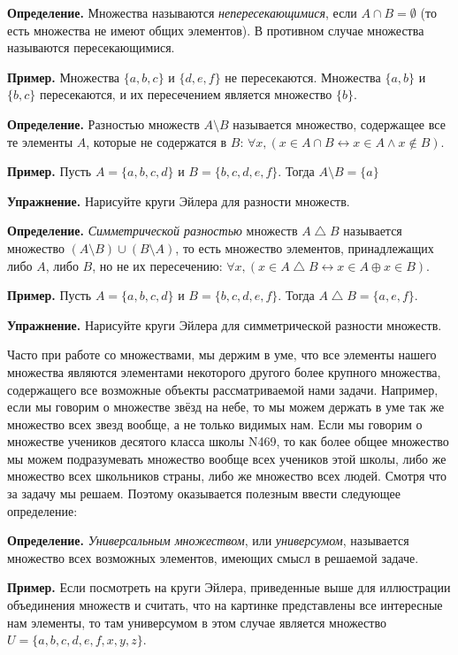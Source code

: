 {\bfseries Определение.} Множества называются {\slshape непересекающимися}, если $A\cap B = \emptyset$ (то есть множества не имеют общих элементов). В противном случае множества называются пересекающимися.

{\bfseries Пример.} Множества $\{a, b, c\}$ и $\{d, e, f\}$ не пересекаются. Множества $\{a, b\}$ и $\{b, c\}$ пересекаются, и их пересечением является множество $\{b\}$.

{\bfseries Определение.} Разностью множеств $A\setminus B$ называется множество, содержащее все те элементы $A$, которые не содержатся в $B$: $\forall x, (x \in A\cap B \leftrightarrow x\in A \wedge x \not \in B)$.

{\bfseries Пример.} Пусть $A = \{a, b, c, d\}$ и $B = \{b, c, d, e, f\}$. Тогда $A\setminus B = \{a\}$

{\bfseries Упражнение.} Нарисуйте круги Эйлера для разности множеств.

{\bfseries Определение.} {\slshape Симметрической разностью} множеств $A\bigtriangleup B$ называется множество $(A\setminus B)\cup (B\setminus A)$, то есть множество элементов, принадлежащих либо $A$, либо $B$, но не их пересечению: $\forall x,(x\in A\bigtriangleup B \leftrightarrow x\in A \oplus x\in B)$.

{\bfseries Пример.} Пусть $A = \{a, b, c, d\}$ и $B = \{b, c, d, e, f\}$. Тогда $A\bigtriangleup B = \{a, e, f\}$.

{\bfseries Упражнение.} Нарисуйте круги Эйлера для симметрической разности множеств.

Часто при работе со множествами, мы держим в уме, что все элементы нашего множества являются элементами некоторого другого более крупного множества, содержащего все возможные объекты рассматриваемой нами задачи. Например, если мы говорим о множестве звёзд на небе, то мы можем держать в уме так же множество всех звезд вообще, а не только видимых нам. Если мы говорим о множестве учеников десятого класса школы N469, то как более общее множество мы можем подразумевать множество вообще всех учеников этой школы, либо же множество всех школьников страны, либо же множество всех людей. Смотря что за задачу мы решаем. Поэтому оказывается полезным ввести следующее определение:

{\bfseries Определение.} {\slshape Универсальным множеством}, или {\slshape универсумом}, называется множество всех возможных элементов, имеющих смысл в решаемой задаче.

{\bfseries Пример.} Если посмотреть на круги Эйлера, приведенные выше для иллюстрации объединения множеств и считать, что на картинке представлены все интересные нам элементы, то там универсумом в этом случае является множество $U = \{a, b, c, d, e, f, x, y, z\}$.


